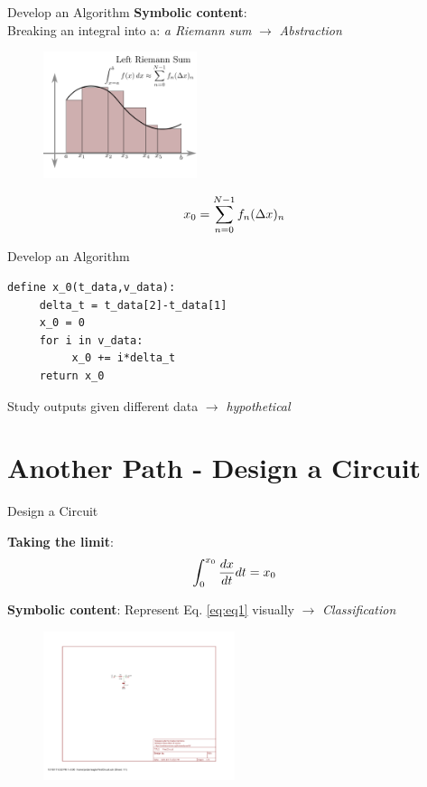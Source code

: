 \documentclass{beamer}
\begin{document}
\begin{frame}{Develop an Algorithm}
\alert{\textbf{Symbolic content}}: \\ 
Breaking an integral into a: \textit{a Riemann sum} $\to$ \textit{\alert{Abstraction}} \vspace{0.5cm}
\begin{figure}
\centering
\includegraphics[width=0.4\textwidth]{figures/LeftRiemann.png}
\end{figure}
\begin{equation}
x_{\rm 0} = \sum_{n=0}^{N-1} f_n (\Delta x)_n
\end{equation}
\end{frame}

\begin{frame}[fragile]{Develop an Algorithm}
\begin{verbatim}
define x_0(t_data,v_data):
     delta_t = t_data[2]-t_data[1]
     x_0 = 0
     for i in v_data:
          x_0 += i*delta_t
     return x_0
\end{verbatim}
Study outputs given different data $\to$ \textit{\alert{hypothetical}}
\end{frame}

\section{Another Path - Design a Circuit}

\begin{frame}{Design a Circuit}
\begin{tcolorbox}
\textbf{Taking the limit}:
\begin{equation} 
\int_{0}^{x_{\rm 0}} \frac{dx}{dt} dt = x_{\rm 0}
\end{equation}
\end{tcolorbox}
\vspace{0.5cm}
\alert{\textbf{Symbolic content}}: Represent Eq. \ref{eq:eq1} visually $\to$ \textit{\alert{Classification}} \\
\begin{figure}
\centering
\includegraphics[width=0.5\textwidth,trim=9.5cm 13cm 15cm 6cm,clip=true]{figures/FirstCircuit.pdf}
\end{figure}
\end{frame}
\end{document}
